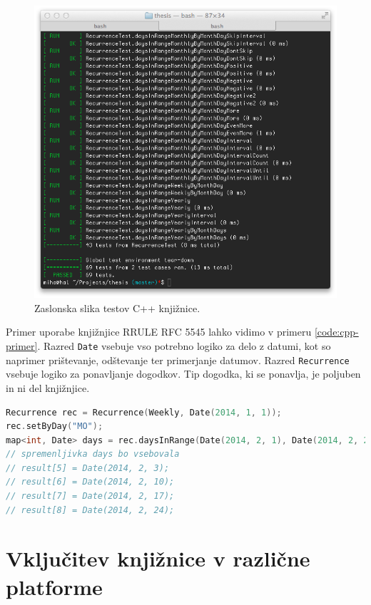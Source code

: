 \begin{figure}
 \includegraphics[width=\linewidth]{cpp-tests}
 \caption{Zaslonska slika testov C++ knjižnice.}
 \label{fig:cpp-tests}
\end{figure}

Primer uporabe knjižnjice RRULE RFC 5545 lahko vidimo v primeru \ref{code:cpp-primer}. Razred \texttt{Date} vsebuje vso potrebno logiko za delo z datumi, kot so naprimer prištevanje, odštevanje ter primerjanje datumov. Razred \texttt{Recurrence} vsebuje logiko za ponavljanje dogodkov. Tip dogodka, ki se ponavlja, je poljuben in ni del knjižnjice.

\begin{lstlisting}[caption={Primer uporabe C++ knjižnjice RRULE standarda RFC 5545. Izbrani dogodek bi se s tem pravilom ponavljal tedensko, vsak ponedeljek, od 1. januarja 2014 naprej.}, label=code:cpp-primer, language=C++]
Recurrence rec = Recurrence(Weekly, Date(2014, 1, 1));
rec.setByDay("MO");
map<int, Date> days = rec.daysInRange(Date(2014, 2, 1), Date(2014, 2, 28));
// spremenljivka days bo vsebovala
// result[5] = Date(2014, 2, 3);
// result[6] = Date(2014, 2, 10);
// result[7] = Date(2014, 2, 17);
// result[8] = Date(2014, 2, 24);
\end{lstlisting}

\chapter{Vključitev knjižnice v različne platforme}
\label{chap:cross-platform}

